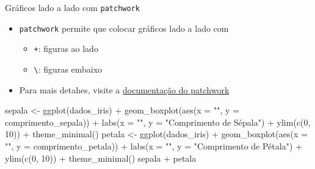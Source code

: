 \documentclass[
  10pt,
  ignorenonframetext,
]{beamer}
\newenvironment{Shaded}{\begin{snugshade}}{\end{snugshade}}
\newcommand{\AttributeTok}[1]{\textcolor[rgb]{0.40,0.45,0.13}{#1}}
\newcommand{\DecValTok}[1]{\textcolor[rgb]{0.68,0.00,0.00}{#1}}
\newcommand{\FunctionTok}[1]{\textcolor[rgb]{0.28,0.35,0.67}{#1}}
\newcommand{\NormalTok}[1]{\textcolor[rgb]{0.00,0.23,0.31}{#1}}
\newcommand{\OtherTok}[1]{\textcolor[rgb]{0.00,0.23,0.31}{#1}}
\newcommand{\SpecialCharTok}[1]{\textcolor[rgb]{0.37,0.37,0.37}{#1}}
\newcommand{\StringTok}[1]{\textcolor[rgb]{0.13,0.47,0.30}{#1}}
\providecommand{\tightlist}{%
  \setlength{\itemsep}{0pt}\setlength{\parskip}{0pt}}\usepackage{longtable,booktabs,array}
\begin{document}
\begin{frame}[fragile]{Gráficos lado a lado com \texttt{patchwork}}
\protect\hypertarget{gruxe1ficos-lado-a-lado-com-patchwork}{}
\begin{itemize}
\tightlist
\item
  \texttt{patchwork} permite que colocar gráficos lado a lado com

  \begin{itemize}
  \tightlist
  \item
    \texttt{+}: figuras ao lado
  \item
    \texttt{\textbackslash{}}: figuras embaixo
  \end{itemize}
\item
  Para mais detahes, visite a
  \href{https://patchwork.data-imaginist.com/articles/patchwork.html}{documentação
  do patchwork}
\end{itemize}

\begin{Shaded}
\begin{Highlighting}[]
\NormalTok{sepala }\OtherTok{\textless{}{-}} \FunctionTok{ggplot}\NormalTok{(dados\_iris) }\SpecialCharTok{+}
  \FunctionTok{geom\_boxplot}\NormalTok{(}\FunctionTok{aes}\NormalTok{(}\AttributeTok{x =} \StringTok{""}\NormalTok{, }\AttributeTok{y =}\NormalTok{ comprimento\_sepala)) }\SpecialCharTok{+}
  \FunctionTok{labs}\NormalTok{(}\AttributeTok{x =} \StringTok{""}\NormalTok{, }\AttributeTok{y =} \StringTok{"Comprimento de Sépala"}\NormalTok{) }\SpecialCharTok{+}
  \FunctionTok{ylim}\NormalTok{(}\FunctionTok{c}\NormalTok{(}\DecValTok{0}\NormalTok{, }\DecValTok{10}\NormalTok{)) }\SpecialCharTok{+}
  \FunctionTok{theme\_minimal}\NormalTok{()}
\NormalTok{petala }\OtherTok{\textless{}{-}} \FunctionTok{ggplot}\NormalTok{(dados\_iris) }\SpecialCharTok{+}
  \FunctionTok{geom\_boxplot}\NormalTok{(}\FunctionTok{aes}\NormalTok{(}\AttributeTok{x =} \StringTok{""}\NormalTok{, }\AttributeTok{y =}\NormalTok{ comprimento\_petala)) }\SpecialCharTok{+}
  \FunctionTok{labs}\NormalTok{(}\AttributeTok{x =} \StringTok{""}\NormalTok{, }\AttributeTok{y =} \StringTok{"Comprimento de Pétala"}\NormalTok{) }\SpecialCharTok{+}
  \FunctionTok{ylim}\NormalTok{(}\FunctionTok{c}\NormalTok{(}\DecValTok{0}\NormalTok{, }\DecValTok{10}\NormalTok{)) }\SpecialCharTok{+}
  \FunctionTok{theme\_minimal}\NormalTok{()}
\NormalTok{sepala }\SpecialCharTok{+}\NormalTok{ petala}
\end{Highlighting}
\end{Shaded}
\end{frame}
\end{document}
